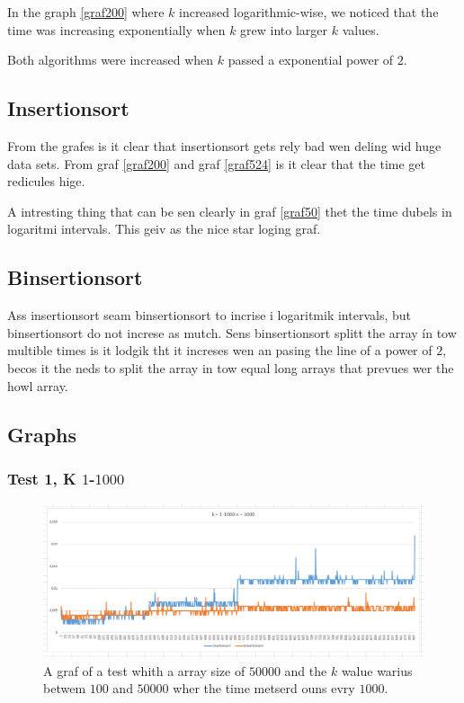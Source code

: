 \documentclass[paper=a4, fontsize=11pt]{scrartcl}
\numberwithin{equation}{section}		%
\numberwithin{figure}{section}			%
\numberwithin{table}{section}				%
\begin{document}
In the graph \ref{graf200} where $k$ increased logarithmic-wise, we noticed that the time was increasing exponentially when $k$ grew into larger $k$ values.

Both algorithms were increased when $k$ passed a exponential power of $2$.

\subsection{Insertionsort}

From the grafes is it clear that insertionsort gets rely bad wen deling wid huge data sets. From graf \ref{graf200} and graf \ref{graf524} is it clear that the time get redicules hige.

A intresting thing that can be sen clearly in graf \ref{graf50} thet the time dubels in logaritmi intervals. This geiv as the nice star loging graf.

\subsection{Binsertionsort}
Ass insertionsort seam binsertionsort to incrise i logaritmik intervals, but binsertionsort do not increse as mutch. Sens binsertionsort splitt the array ín tow multible times is it lodgik tht it increses wen an pasing the line of a power of $2$, becos it the neds to split the array in tow equal long arrays that prevues wer the howl array.



\newpage

\subsection{Graphs}

\subsubsection{Test 1, K $1$-$1000$}

\begin{figure}[H]
\centering
\includegraphics[width=150mm]{k1-1000N=1000.png}
\caption{A graf of a test whith a array size of $50 000$ and the $k$ walue warius betwem $100$ and $50 000$ wher the time metserd ouns evry $1000$. \label{graf1000}}
\end{figure}
\end{document}
